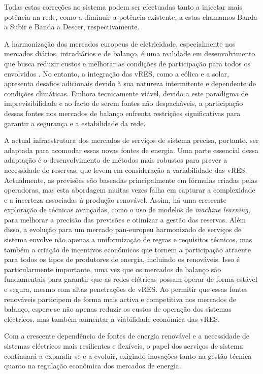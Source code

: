 Todas estas correções no sistema podem ser efectuadas tanto a injectar mais potência na rede, como a diminuir a potência existente, a estas chamamos Banda a Subir e Banda a Descer, respectivamente.\par
A harmonização dos mercados europeus de eletricidade, especialmente nos mercados diários, intradiários e de balanço, é uma realidade em desenvolvimento que busca reduzir custos e melhorar as condições de participação para todos os envolvidos \cite{Algarvio2019}. No entanto, a integração das \gls{vRES}, como a eólica e a solar, apresenta desafios adicionais devido à sua natureza intermitente e dependente de condições climáticas. Embora tecnicamente viável, devido a este paradigma de imprevisibilidade e ao facto de serem fontes não despacháveis, a participação dessas fontes nos mercados de balanço enfrenta restrições significativas para garantir a segurança e a estabilidade da rede.\par
A actual infraestrutura dos mercados de serviços de sistema precisa, portanto, ser adaptada para acomodar essas novas fontes de energia. Uma parte essencial dessa adaptação é o desenvolvimento de métodos mais robustos para prever a necessidade de reservas, que levem em consideração a variabilidade das \gls{vRES}. Actualmente, as previsões são baseadas principalmente em fórmulas criadas pelas operadoras, mas esta abordagem muitas vezes falha em capturar a complexidade e a incerteza associadas à produção renovável. Assim, há uma crescente exploração de técnicas avançadas, como o uso de modelos de \textit{machine learning}, para melhorar a precisão das previsões e otimizar a gestão das reservas.
Além disso, a evolução para um mercado pan-europeu harmonizado de serviços de sistema envolve não apenas a uniformização de regras e requisitos técnicos, mas também a criação de incentivos económicos que tornem a participação atraente para todos os tipos de produtores de energia, incluindo os renováveis. Isso é particularmente importante, uma vez que os mercados de balanço são fundamentais para garantir que as redes elétricas possam operar de forma estável e segura, mesmo com altas penetrações de \gls{vRES}. Ao permitir que essas fontes renováveis participem de forma mais activa e competitiva nos mercados de balanço, espera-se não apenas reduzir os custos de operação dos sistemas eléctricos, mas também aumentar a viabilidade económica das \gls{vRES}.\par
Com a crescente dependência de fontes de energia renovável e a necessidade de sistemas eléctricos mais resilientes e flexíveis, o papel dos serviços de sistema continuará a expandir-se e a evoluir, exigindo inovações tanto na gestão técnica quanto na regulação econômica dos mercados de energia.\par


